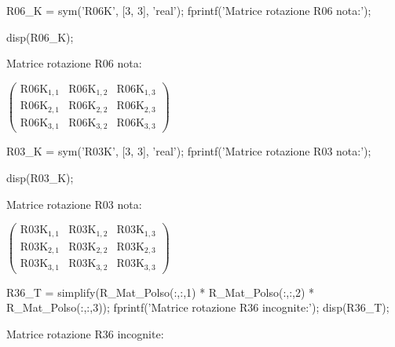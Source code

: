 \documentclass[11pt, a4paper]{article}
\begin{document}
\begin{matlabcode}

R06_K = sym('R06K', [3, 3], 'real');
fprintf('Matrice rotazione R06 nota:');

disp(R06_K);
\end{matlabcode}
\begin{matlaboutput}
Matrice rotazione R06 nota:
\end{matlaboutput}
\begin{matlabsymbolicoutput}
$\displaystyle \left(\begin{array}{ccc}
{\textrm{R06K}}_{1,1}  & {\textrm{R06K}}_{1,2}  & {\textrm{R06K}}_{1,3} \\
{\textrm{R06K}}_{2,1}  & {\textrm{R06K}}_{2,2}  & {\textrm{R06K}}_{2,3} \\
{\textrm{R06K}}_{3,1}  & {\textrm{R06K}}_{3,2}  & {\textrm{R06K}}_{3,3}
\end{array}\right)$
\end{matlabsymbolicoutput}
\begin{matlabcode}

R03_K = sym('R03K', [3, 3], 'real');
fprintf('Matrice rotazione R03 nota:');

disp(R03_K);
\end{matlabcode}
\begin{matlaboutput}
Matrice rotazione R03 nota:
\end{matlaboutput}
\begin{matlabsymbolicoutput}
$\displaystyle \left(\begin{array}{ccc}
{\textrm{R03K}}_{1,1}  & {\textrm{R03K}}_{1,2}  & {\textrm{R03K}}_{1,3} \\
{\textrm{R03K}}_{2,1}  & {\textrm{R03K}}_{2,2}  & {\textrm{R03K}}_{2,3} \\
{\textrm{R03K}}_{3,1}  & {\textrm{R03K}}_{3,2}  & {\textrm{R03K}}_{3,3}
\end{array}\right)$
\end{matlabsymbolicoutput}
\begin{matlabcode}

R36_T = simplify(R_Mat_Polso(:,:,1) * R_Mat_Polso(:,:,2) * R_Mat_Polso(:,:,3));
fprintf('Matrice rotazione R36 incognite:');
disp(R36_T);
\end{matlabcode}
\begin{matlaboutput}
Matrice rotazione R36 incognite:
\end{matlaboutput}
\end{document}
